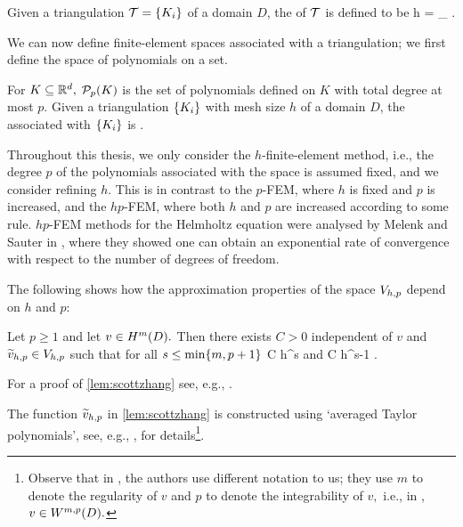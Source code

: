 Given a triangulation $\cT = \set{\Ki}$ of a domain $D$, the  of $\mathcal T$ is defined to be
\beqs
h = \max_{\Ki} \diam{\Ki}.
\eeqs
\ede

    We can now define finite-element spaces associated with a triangulation; we first define the space of polynomials on a set.

For $K \subseteq \mathbb R^{d},$ $\polyp{K}$ is the set of polynomials defined on $K$ with total degree at most $p.$
\ede
    Given a triangulation $\set{\Ki}$ with mesh size $h$ of a domain $D$, the  associated with $\set{\Ki}$ is
    \beqs
\Vhp \de {}.
    \eeqs
    \ede

Throughout this thesis, we only consider the $h$-finite-element method, i.e., the degree $p$ of the polynomials associated with the space is assumed fixed, and we consider refining $h.$ This is in contrast to the $p$-FEM, where $h$ is fixed and $p$ is increased, and the $hp$-FEM, where both $h$ and $p$ are increased according to some rule. $hp$-FEM methods for the Helmholtz equation were analysed by Melenk and Sauter in \cite{MeSa:10,MeSa:11}, where they showed one can obtain an exponential rate of convergence with respect to the number of degrees of freedom.

    The following  shows how the approximation properties of the space $V_{h,p}$ depend on $h$ and $p$:

    \label{lem:scottzhang}
    Let $p \geq 1$ and let $v \in \HmD.$ Then there exists $C>0$ independent of $v$ and $\widetilde{v}_{h,p} \in V_{h,p}$ such that for all $s \leq \min\set{m,p+1}$
    \beqs
{} \leq C h^s 
    \eeqs
    and
    \beqs
{} \leq C h^{s-1} .
    \eeqs
    \ele

    For a proof of \cref{lem:scottzhang} see, e.g., \cite[Corollary 4.4.24, Remark 4.4.27]{BrSc:08}.

The function $\widetilde{v}_{h,p}$ in \cref{lem:scottzhang} is constructed using `averaged Taylor polynomials', see, e.g., \cite{ScZh:90},\cite[Section 4.4]{BrSc:08} for details\footnote{Observe that in \cite{BrSc:08}, the authors use different notation to us; they use $m$ to denote the regularity of $v$ and $p$ to denote the integrability of $v,$ i.e., in \cite{BrSc:08}, $v \in \WmpD.$}.
    \ere

